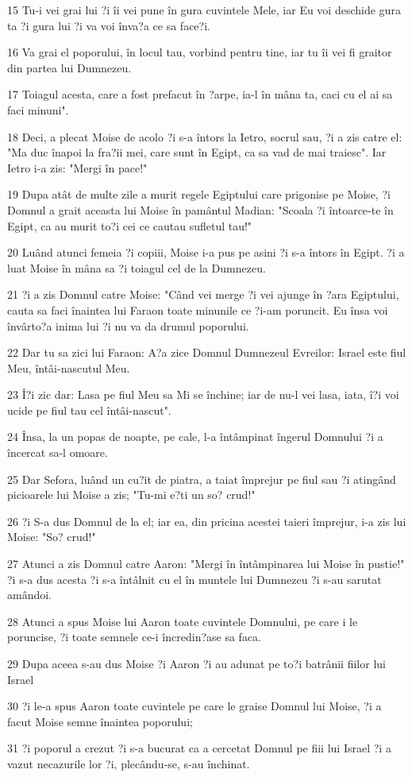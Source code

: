 \par 15 Tu-i vei grai lui ?i îi vei pune în gura cuvintele Mele, iar Eu voi deschide gura ta ?i gura lui ?i va voi înva?a ce sa face?i.
\par 16 Va grai el poporului, în locul tau, vorbind pentru tine, iar tu îi vei fi graitor din partea lui Dumnezeu.
\par 17 Toiagul acesta, care a fost prefacut în ?arpe, ia-l în mâna ta, caci cu el ai sa faci minuni".
\par 18 Deci, a plecat Moise de acolo ?i s-a întors la Ietro, socrul sau, ?i a zis catre el: "Ma duc înapoi la fra?ii mei, care sunt în Egipt, ca sa vad de mai traiesc". Iar Ietro i-a zis: "Mergi în pace!"
\par 19 Dupa atât de multe zile a murit regele Egiptului care prigonise pe Moise, ?i Domnul a grait aceasta lui Moise în pamântul Madian: "Scoala ?i întoarce-te în Egipt, ca au murit to?i cei ce cautau sufletul tau!"
\par 20 Luând atunci femeia ?i copiii, Moise i-a pus pe asini ?i s-a întors în Egipt. ?i a luat Moise în mâna sa ?i toiagul cel de la Dumnezeu.
\par 21 ?i a zis Domnul catre Moise: "Când vei merge ?i vei ajunge în ?ara Egiptului, cauta sa faci înaintea lui Faraon toate minunile ce ?i-am poruncit. Eu însa voi învârto?a inima lui ?i nu va da drumul poporului.
\par 22 Dar tu sa zici lui Faraon: A?a zice Domnul Dumnezeul Evreilor: Israel este fiul Meu, întâi-nascutul Meu.
\par 23 Î?i zic dar: Lasa pe fiul Meu sa Mi se închine; iar de nu-l vei lasa, iata, î?i voi ucide pe fiul tau cel întâi-nascut".
\par 24 Însa, la un popas de noapte, pe cale, l-a întâmpinat îngerul Domnului ?i a încercat sa-l omoare.
\par 25 Dar Sefora, luând un cu?it de piatra, a taiat împrejur pe fiul sau ?i atingând picioarele lui Moise a zis; "Tu-mi e?ti un so? crud!"
\par 26 ?i S-a dus Domnul de la el; iar ea, din pricina acestei taieri împrejur, i-a zis lui Moise: "So? crud!"
\par 27 Atunci a zis Domnul catre Aaron: "Mergi în întâmpinarea lui Moise în pustie!" ?i s-a dus acesta ?i s-a întâlnit cu el în muntele lui Dumnezeu ?i s-au sarutat amândoi.
\par 28 Atunci a spus Moise lui Aaron toate cuvintele Domnului, pe care i le poruncise, ?i toate semnele ce-i încredin?ase sa faca.
\par 29 Dupa aceea s-au dus Moise ?i Aaron ?i au adunat pe to?i batrânii fiilor lui Israel
\par 30 ?i le-a spus Aaron toate cuvintele pe care le graise Domnul lui Moise, ?i a facut Moise semne înaintea poporului;
\par 31 ?i poporul a crezut ?i s-a bucurat ca a cercetat Domnul pe fiii lui Israel ?i a vazut necazurile lor ?i, plecându-se, s-au închinat.

